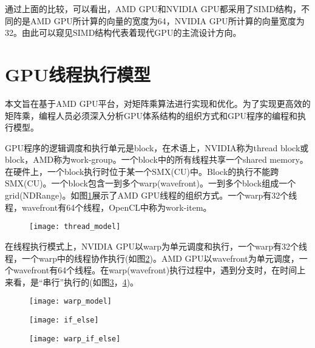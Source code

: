 通过上面的比较，可以看出，AMD GPU和NVIDIA GPU都采用了SIMD结构，不同的是AMD GPU所计算的向量的宽度为64，NVIDIA GPU所计算的向量宽度为32。由此可以窥见SIMD结构代表着现代GPU的主流设计方向。




\section{GPU线程执行模型}
本文旨在基于AMD GPU平台，对矩阵乘算法进行实现和优化。为了实现更高效的矩阵乘，编程人员必须深入分析GPU体系结构的组织方式和GPU程序的编程和执行模型。

GPU程序的逻辑调度和执行单元是block，在术语上，NVIDIA称为thread block或block，AMD称为work-group。一个block中的所有线程共享一个shared memory。在硬件上，一个block执行时位于某一个SMX(CU)中。Block的执行不能跨SMX(CU)。一个block包含一到多个warp(wavefront)。一到多个block组成一个grid(NDRange)。如图\ref{fig:thread_model}展示了AMD GPU线程的组织方式。一个warp有32个线程，wavefront有64个线程，OpenCL中称为work-item。

\begin{figure}[htbp]
	\centering
	\texttt{[image: thread\_model]}
	\label{fig:thread_model}
\end{figure}

在线程执行模式上，NVIDIA GPU以warp为单元调度和执行，一个warp有32个线程，一个warp中的线程协作执行(如图\ref{fig:warp_model})。AMD GPU以wavefront为单元调度，一个wavefront有64个线程。在warp(wavefront)执行过程中，遇到分支时，在时间上来看，是“串行”执行的(如图\ref{fig:if_else}，\ref{fig:warp_if_else})。

\begin{figure}[htbp]
	\centering
	\texttt{[image: warp\_model]}
	\label{fig:warp_model}
\end{figure}


\begin{figure}[htbp]
	\centering
	\texttt{[image: if\_else]}
	\label{fig:if_else}
\end{figure}

\begin{figure}[htbp]
	\centering
	\texttt{[image: warp\_if\_else]}
	\label{fig:warp_if_else}
\end{figure}

